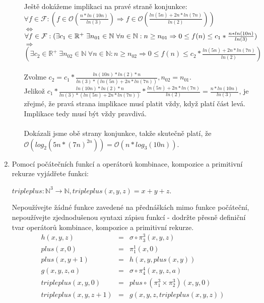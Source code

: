 \documentclass[a4paper,11pt]{article}[24.3.2010]
\begin{document}
\begin{enumerate}
\begin{enumerate}
      Ještě dokážeme implikaci na pravé straně konjunkce:\\
      $\forall f \in \mathcal{F} : (f \in \mathcal{O}(\frac{n*ln(10n)}{ln(3)}) \Rightarrow f \in \mathcal{O}(\frac{ln(5n)+2n*ln(7n)}{ln(2)}))$\\
      $\Leftrightarrow$\\
      $\forall f \in \mathcal{F} :\\ (\exists c_{1} \in \mathbb{R}^+ \hspace{3pt} \exists n_{01} \in \mathbb{N} \hspace{3pt} \forall n \in \mathbb{N} : n \geq n_{01} \Rightarrow 0 \leq f(n) \leq c_{1}*\frac{n*ln(10n)}{ln(3)})$\\
      $\Rightarrow$\\
      $(\exists c_{2} \in \mathbb{R}^+ \hspace{3pt} \exists n_{02} \in \mathbb{N} \hspace{3pt} \forall n \in \mathbb{N} : n \geq n_{02} \Rightarrow 0 \leq f(n) \leq c_{2}*\frac{ln(5n)+2n*ln(7n)}{ln(2)})$\\\\
      Zvolme $c_{2}=c_{1}*\frac{ln(10n)*ln(2)*n}{ln(3)*(ln(5n)+2n*ln(7n))},n_{02}=n_{01}$.\\ 
      Jelikož $c_{1}*\frac{ln(10n)*ln(2)*n}{ln(3)*(ln(5n)+2n*ln(7n))}*\frac{ln(5n)+2n*ln(7n)}{ln(2)}=\frac{n*ln(10n)}{ln(3)}$, je zřejmé, že pravá strana implikace musí platit vždy, když platí část levá. Implikace tedy musí být vždy pravdivá.\\\\
      Dokázali jsme obě strany konjunkce, takže skutečně platí, že $\mathcal{O}(log_{2}(5n*(7n)^{2n})) = \mathcal{O}(n*log_{3}(10n))$.
\end{enumerate}
\renewcommand{\theenumi}{\arabic{enumi}}
\newpage
\item Pomocí počátečních funkcí a operátorů kombinace, kompozice a primitivní rekurze vyjádřete funkci:\\
\begin{center}
        $tripleplus : \mathbb{N}^3 \rightarrow \mathbb{N}, tripleplus(x,y,z)=x+y+z$.\\
\end{center}
Nepoužívejte žádné funkce zavedené na přednáškách mimo funkce počáteční, nepoužívejte zjednodušenou syntaxi zápisu funkcí - dodržte přesně definiční tvar operátorů kombinace, kompozice a primitivní rekurze.
\begin{eqnarray*}
       h(x,y,z)&=&\sigma\circ\pi^{3}_{3}(x,y,z)\\
       plus(x,0)&=&\pi^{1}_{1}(x,0)\\
       plus(x,y+1)&=&h(x, y, plus(x, y))\\
       g(x,y,z,a)&=&\sigma\circ\pi^{4}_{4}(x,y,z,a)\\
       tripleplus(x,y,0)&=&plus\circ(\pi^{3}_{1}\times\pi^{3}_{2})(x,y,0)\\
       tripleplus(x,y,z+1)&=&g(x,y,z, tripleplus(x, y,z))\\
  \end{eqnarray*}
 




\end{enumerate}
\end{document}
